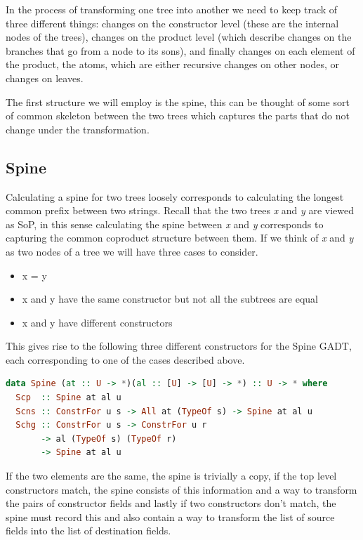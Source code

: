 \documentclass[11pt]{article}
\begin{document}
In the process of transforming one tree into another we need to keep track of three different things: 
changes on the constructor level (these are the internal nodes of the trees), changes on the product level (which 
describe changes on the branches that go from a node to its sons), and finally changes on each element of the 
product, the atoms, which are either recursive changes on other nodes, or 
changes on leaves.

The first structure we will employ is the spine, this can be thought of some 
sort of common skeleton between the two trees which captures the parts that do 
not change under the transformation.

\subsection{Spine}\label{spine}

Calculating a spine for two trees loosely corresponds to calculating the
longest common prefix between two strings. Recall that the two trees
\emph{x} and \emph{y} are viewed as SoP, in this sense calculating the
spine between \emph{x} and \emph{y} corresponds to capturing the common
coproduct structure between them. If we think of \emph{x} and \emph{y} as two nodes of a tree we will have three cases to
consider. 
\begin{itemize}
  \item x = y 
  \item x and y have the same constructor but not all the
subtrees are equal  
  \item x and y have different constructors
\end{itemize}

This gives rise
to the following three different constructors for the Spine GADT, each
corresponding to one of the cases described above.

\begin{lstlisting}[language=haskell]
data Spine (at :: U -> *)(al :: [U] -> [U] -> *) :: U -> * where
  Scp  :: Spine at al u
  Scns :: ConstrFor u s -> All at (TypeOf s) -> Spine at al u
  Schg :: ConstrFor u s -> ConstrFor u r
       -> al (TypeOf s) (TypeOf r)
       -> Spine at al u
\end{lstlisting}

If the two
elements are the same, the spine is trivially a copy, if the top level
constructors match, the spine consists of this information and a way to
transform the pairs of constructor fields and lastly if two constructors
don't match, the spine must record this and also contain a way to
transform the list of source fields into the list of destination fields.
\end{document}
